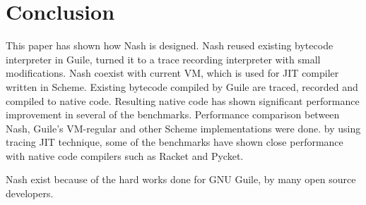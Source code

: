\documentclass[preprint, 10pt]{sigplanconf}
\begin{document}
\section{Conclusion}
\label{sec:conclusion}
This paper has shown how Nash is designed. Nash reused existing bytecode
interpreter in Guile, turned it to a trace recording interpreter with small
modifications. Nash coexist with current VM, which is used for JIT compiler
written in Scheme. Existing bytecode compiled by Guile are traced, recorded
and compiled to native code. Resulting native code has shown significant
performance improvement in several of the benchmarks.  Performance comparison
between Nash, Guile's VM-regular and other Scheme implementations were
done. by using tracing JIT technique, some of the benchmarks have shown
close performance with native code compilers such as Racket and Pycket.


\acks{} Nash exist because of the hard works done for GNU Guile, by many open
source developers.







\end{document}
